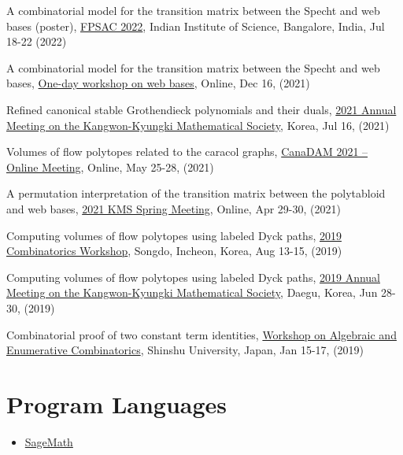 \documentclass[letterpaper]{article}
\begin{document}
\begin{etaremune}
\item A combinatorial model for the transition matrix between the Specht and web bases (poster), \href{https://math.iisc.ac.in/fpsac2022/}{FPSAC 2022}, Indian Institute of Science, Bangalore, India, Jul 18-22 (2022)
\item A combinatorial model for the transition matrix between the Specht and web bases, \href{https://www.kias.re.kr/kias/activities/seminars/list.do?menuNo=404003&eventTy=&schoolsCd=C&centrspgmsCd=&pageIndex=1&sdate=2021-12-15&edate=2021-12-17&mjrcdnm=&searchCnd=1&searchWord=}{One-day workshop on web bases}, Online, Dec 16, (2021)
\item Refined canonical stable Grothendieck polynomials and their duals, \href{http://www.kkms.org/main/main}{2021 Annual Meeting on the Kangwon-Kyungki Mathematical Society}, Korea, Jul 16, (2021)
\item Volumes of flow polytopes related to the caracol graphs, \href{https://2021.canadam.math.ca/}{CanaDAM 2021 – Online Meeting}, Online, May 25-28, (2021)
\item A permutation interpretation of the transition matrix between the polytabloid and web bases, \href{https://www.kms.or.kr/meetings/spring2021/}{2021 KMS Spring Meeting}, Online, Apr 29-30, (2021)
\item Computing volumes of flow polytopes using labeled Dyck paths, \href{https://cw2019.combinatorics.kr/information}{2019 Combinatorics Workshop}, Songdo, Incheon, Korea, Aug 13-15, (2019) 
\item Computing volumes of flow polytopes using labeled Dyck paths, \href{http://www.kkms.org/main/main}{2019 Annual Meeting on the Kangwon-Kyungki Mathematical Society}, Daegu, Korea, Jun 28-30, (2019) 
\item Combinatorial proof of two constant term identities, \href{http://math.shinshu-u.ac.jp/~nu/html/workshop/20190115-shinshu/}{Workshop on Algebraic and Enumerative Combinatorics}, Shinshu University, Japan, Jan 15-17, (2019)
\end{etaremune}

\section*{Program Languages}
\begin{itemize}
\item \href{https://www.sagemath.org/}{SageMath}
\end{itemize}


\end{document}
